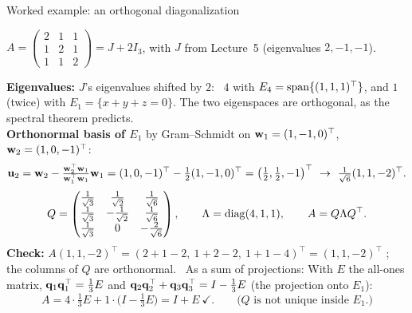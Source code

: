 \documentclass[aspectratio=1610,11pt]{beamer}
\begin{document}

\begin{frame}{Worked example: an orthogonal diagonalization}
    \begin{example}[][ex:spectral]
        \small $A = \begin{pmatrix} 2 & 1 & 1 \\ 1 & 2 & 1 \\ 1 & 1 & 2 \end{pmatrix} = J + 2I_3$, with $J$ from Lecture~5 (eigenvalues $2, -1, -1$).
    \end{example}
    \small
    \textbf{Eigenvalues:} $J$'s eigenvalues shifted by $2$: \ $4$ with $E_4 = \operatorname{span}\{(1, 1, 1)^\top\}$, and $1$ (twice) with $E_1 = \{x + y + z = 0\}$. The two eigenspaces are orthogonal, as the spectral theorem predicts.
    \\[0.3em]
    \textbf{Orthonormal basis of $E_1$} by Gram--Schmidt on $\mathbf{w}_1 = (1, -1, 0)^\top$, $\mathbf{w}_2 = (1, 0, -1)^\top$:
    \[\mathbf{u}_2 = \mathbf{w}_2 - \tfrac{\mathbf{w}_2^\top\mathbf{w}_1}{\mathbf{w}_1^\top\mathbf{w}_1}\mathbf{w}_1 = (1, 0, -1)^\top - \tfrac{1}{2}(1, -1, 0)^\top = \big(\tfrac{1}{2}, \tfrac{1}{2}, -1\big)^\top \ \to\ \tfrac{1}{\sqrt6}(1, 1, -2)^\top.\]
    \[Q = \begin{pmatrix} \frac{1}{\sqrt{3}} & \frac{1}{\sqrt{2}} & \frac{1}{\sqrt{6}} \\ \frac{1}{\sqrt{3}} & -\frac{1}{\sqrt{2}} & \frac{1}{\sqrt{6}} \\ \frac{1}{\sqrt{3}} & 0 & -\frac{2}{\sqrt{6}} \end{pmatrix}, \qquad \Lambda = \operatorname{diag}(4, 1, 1), \qquad A = Q\Lambda Q^\top.\]
    \textbf{Check:} $A(1, 1, -2)^\top = (2 + 1 - 2,\ 1 + 2 - 2,\ 1 + 1 - 4)^\top = (1, 1, -2)^\top$ \checkmark; the columns of $Q$ are orthonormal. \ As a sum of projections:
    With $E$ the all-ones matrix, $\mathbf{q}_1\mathbf{q}_1^\top = \frac{1}{3}E$ and $\mathbf{q}_2\mathbf{q}_2^\top + \mathbf{q}_3\mathbf{q}_3^\top = I - \frac{1}{3}E$ (the projection onto $E_1$):
    \[A = 4 \cdot \tfrac{1}{3}E + 1 \cdot \big(I - \tfrac{1}{3}E\big) = I + E \ \checkmark. \qquad \text{($Q$ is not unique inside } E_1\text{.)}\]
\end{frame}
\end{document}
